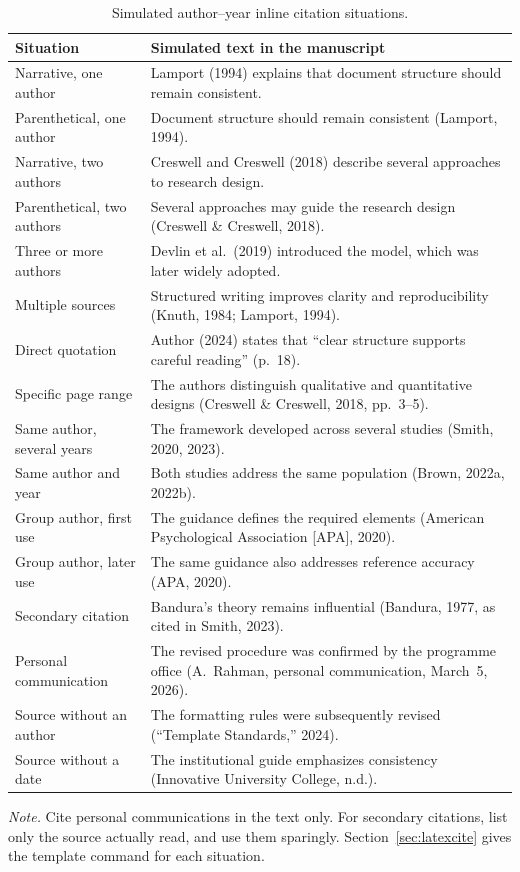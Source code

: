 \documentclass[11pt,a4paper]{article}
\newcommand\thd[1]{\bfseries #1}
\begin{document}
\begin{table}[htbp]
\caption{Simulated author--year inline citation situations.}
\label{tab:cite}
\small
\begin{tabularx}{\textwidth}{@{}>{\raggedright\arraybackslash}p{38mm}X@{}}
\toprule
\thd{Situation} & \thd{Simulated text in the manuscript} \\
\midrule
Narrative, one author        & Lamport (1994) explains that document structure should remain consistent. \\
Parenthetical, one author    & Document structure should remain consistent (Lamport, 1994). \\
Narrative, two authors       & Creswell and Creswell (2018) describe several approaches to research design. \\
Parenthetical, two authors   & Several approaches may guide the research design (Creswell \& Creswell, 2018). \\
Three or more authors        & Devlin et al.\ (2019) introduced the model, which was later widely adopted. \\
Multiple sources             & Structured writing improves clarity and reproducibility (Knuth, 1984; Lamport, 1994). \\
Direct quotation             & Author (2024) states that ``clear structure supports careful reading'' (p.~18). \\
Specific page range          & The authors distinguish qualitative and quantitative designs (Creswell \& Creswell, 2018, pp.~3--5). \\
Same author, several years   & The framework developed across several studies (Smith, 2020, 2023). \\
Same author and year         & Both studies address the same population (Brown, 2022a, 2022b). \\
Group author, first use      & The guidance defines the required elements (American Psychological Association [APA], 2020). \\
Group author, later use      & The same guidance also addresses reference accuracy (APA, 2020). \\
Secondary citation           & Bandura's theory remains influential (Bandura, 1977, as cited in Smith, 2023). \\
Personal communication       & The revised procedure was confirmed by the programme office (A.~Rahman, personal communication, March~5, 2026). \\
Source without an author     & The formatting rules were subsequently revised (``Template Standards,'' 2024). \\
Source without a date        & The institutional guide emphasizes consistency (Innovative University College, n.d.). \\
\bottomrule
\end{tabularx}
\par\smallskip\raggedright\small\textit{Note.} Cite personal communications in
the text only. For secondary citations, list only the source actually read, and
use them sparingly. Section~\ref{sec:latexcite} gives the template command for
each situation.
\end{table}
\end{document}
